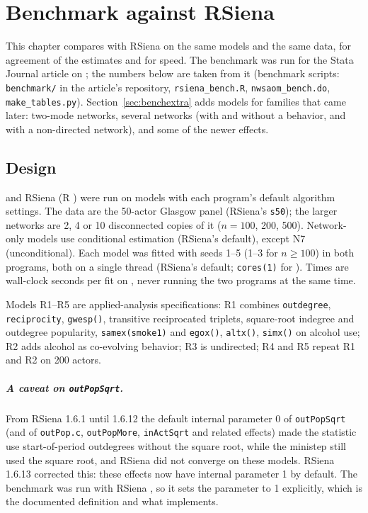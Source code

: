 \chapter{Benchmark against RSiena}
\label{ch:benchmark}


\graphicspath{{bench/}}

This chapter compares \nwsaom{} with RSiena on the same models and the same
data, for agreement of the estimates and for speed. The benchmark was run for
the Stata Journal article on \nwsaom{}; the numbers below are taken from it
(benchmark scripts: \texttt{benchmark/} in the article's repository,
\texttt{rsiena\_bench.R}, \texttt{nwsaom\_bench.do}, \texttt{make\_tables.py}).
Section~\ref{sec:benchextra} adds models for families that came later: two-mode networks, several networks (with and without a behavior, and with a non-directed network), and some of the newer effects.

\section{Design}

\nwsaom{} and RSiena \benchrsiena{} (R \benchrver) were run on \benchnmodels{}
models with each program's default algorithm settings. The data are the
50-actor Glasgow panel (RSiena's \texttt{s50}); the larger networks are 2, 4 or
10 disconnected copies of it ($n=100$, 200, 500). Network-only models use
conditional estimation (RSiena's default), except N7 (unconditional). Each
model was fitted with seeds 1--5 (1--3 for $n\ge 100$) in both programs, both on
a single thread (RSiena's default; \texttt{cores(1)} for \nwsaom{}). Times
are wall-clock seconds per fit on \benchmachine{}, never running the two
programs at the same time.

Models R1--R5 are applied-analysis specifications: R1 combines \texttt{outdegree},
\texttt{reciprocity}, \texttt{gwesp()}, transitive reciprocated triplets,
square-root indegree and outdegree popularity, \texttt{samex(smoke1)} and
\texttt{egox()}, \texttt{altx()}, \texttt{simx()} on alcohol use; R2 adds alcohol
as co-evolving behavior; R3 is undirected; R4 and R5 repeat R1 and R2 on 200
actors.

\paragraph{A caveat on \texttt{outPopSqrt}.} From RSiena 1.6.1 until 1.6.12 the default
internal parameter 0 of \texttt{outPopSqrt} (and of \texttt{outPop.c}, \texttt{outPopMore},
\texttt{inActSqrt} and related effects) made the statistic use start-of-period outdegrees without
the square root, while the ministep still used the square root, and RSiena did not converge on
these models. RSiena 1.6.13 corrected this: these effects now have internal parameter 1 by
default. The benchmark was run with RSiena \benchrsiena{}, so it sets the parameter to 1
explicitly, which is the documented definition and what \nwsaom{} implements.

